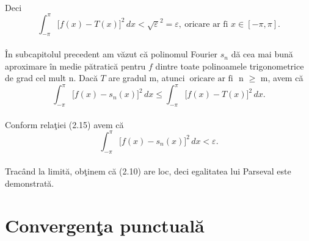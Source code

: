 \documentclass[a4paper,openany,12pt]{report}
\begin{document}
\paragraph*{} Deci
\begin{equation}
 \int_{-\pi}^{\pi} \Big[f(x) - T(x)\Big]^2\,dx < {\sqrt \varepsilon}^2 = \varepsilon,\: \text{oricare ar fi } x \in [-\pi, \pi].
\end{equation}
\paragraph*{} \^ In subcapitolul precedent am v\u azut c\u a polinomul Fourier $s_n$ d\u a cea mai bun\u a aproximare \^ in medie p\u atratic\u a pentru $f$ dintre toate polinoamele trigonometrice de grad cel mult n. Dac\u a $T$ are gradul m, atunci $\: \text{oricare ar fi }$ n $\geq$ m, avem c\u a
\begin{equation*}
\int_{-\pi}^{\pi} \Big[f(x) - s_n(x)\Big]^2\,dx \leq \int_{-\pi}^{\pi} \Big[f(x) - T(x)\Big]^2\,dx.
\end{equation*}
\paragraph*{}Conform rela\c tiei (2.15) avem c\u a
\begin{equation*}
\int_{-\pi}^{\pi} \Big[f(x) - s_n(x)\Big]^2\,dx < \varepsilon.
\end{equation*}
\paragraph*{} Trac\^ and la limit\u a, ob\c tinem c\u a (2.10) are loc, deci egalitatea lui Parseval este demonstrat\u a. 



\section{Convergen\c ta punctual\u a}
\end{document}
